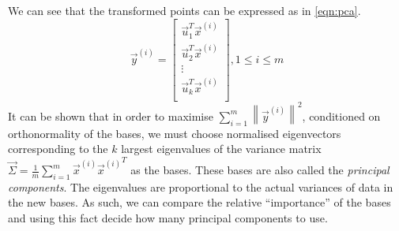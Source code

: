 We can see that the transformed points can be expressed as in \eqref{eqn:pca}.
\begin{equation}
 	\vec y^{(i)} =
 		\begin{bmatrix}
 			\vec u_1^T \vec x^{(i)} \\
 			\vec u_2^T \vec x^{(i)} \\
 			\vdots \\
 			\vec u_k^T \vec x^{(i)} \\
 		\end{bmatrix}
 		, 1 \leq i \leq m
	\label{eqn:pca}
\end{equation}
It can be shown that in order to maximise $\sum_{i = 1}^m \left\| \vec y^{(i)} \right\|^2$, conditioned on orthonormality of the bases, we must choose normalised eigenvectors corresponding to the $k$ largest eigenvalues of the variance matrix $\vec \Sigma = \frac{1}{m} \sum_{i = 1}^m \vec x^{(i)} {\vec x^{(i)}}^T$ as the bases. These bases are also called the \emph{principal components}. The eigenvalues are proportional to the actual variances of data in the new bases. As such, we can compare the relative ``importance'' of the bases and using this fact decide how many principal components to use.